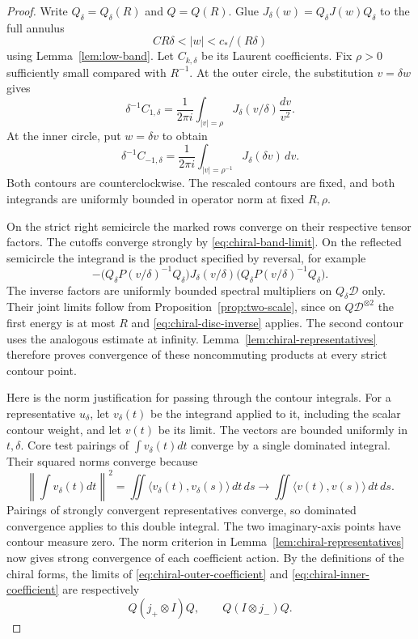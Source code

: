 \begin{proof}
Write $Q_\delta=Q_\delta(R)$ and $Q=Q(R)$. Glue
$J_\delta(w)=Q_\delta J(w)Q_\delta$ to the full annulus
\[
                  CR\delta<|w|<c_* /(R\delta)
\]
using Lemma~\ref{lem:low-band}. Let $C_{k,\delta}$ be its Laurent
coefficients. Fix $\rho>0$ sufficiently small compared with $R^{-1}$.
At the outer circle, the substitution $v=\delta w$ gives
\begin{equation}\label{eq:chiral-outer-coefficient}
 \delta^{-1}C_{1,\delta}
    =\frac1{2\pi i}\int_{|v|=\rho}
                  J_\delta(v/\delta)\frac{dv}{v^2}.
\end{equation}
At the inner circle, put $w=\delta v$ to obtain
\begin{equation}\label{eq:chiral-inner-coefficient}
 \delta^{-1}C_{-1,\delta}
    =\frac1{2\pi i}\int_{|v|=\rho^{-1}}
                              J_\delta(\delta v)\,dv.
\end{equation}
Both contours are counterclockwise. The rescaled contours are fixed, and
both integrands are uniformly bounded in operator norm at fixed $R,\rho$.

On the strict right semicircle the marked rows converge on their respective
tensor factors. The cutoffs converge strongly by
\eqref{eq:chiral-band-limit}. On the reflected semicircle the integrand is
the product specified by reversal, for example
\[
 -\bigl(Q_\delta P(v/\delta)^{-1}Q_\delta\bigr)
     J_\delta(v/\delta)
     \bigl(Q_\delta P(v/\delta)^{-1}Q_\delta\bigr).
\]
The inverse factors are uniformly bounded spectral multipliers on
$Q_\delta\mathcal D$ only. Their joint limits follow from
Proposition~\ref{prop:two-scale}, since on $Q\mathcal D^{\otimes2}$
the first energy is at most $R$ and \eqref{eq:chiral-disc-inverse}
applies. The second contour uses the analogous estimate at infinity.
Lemma~\ref{lem:chiral-representatives} therefore proves convergence of
these noncommuting products at every strict contour point.

Here is the norm justification for passing through the contour integrals.
For a representative $u_\delta$, let $v_\delta(t)$ be the integrand
applied to it, including the scalar contour weight, and let $v(t)$ be
its limit. The vectors are bounded uniformly in $t,\delta$. Core test
pairings of $\int v_\delta(t)dt$ converge by a single dominated integral.
Their squared norms converge because
\begin{equation}\label{eq:chiral-double-contour}
 \left\|\int v_\delta(t)dt\right\|^2
 =\iint\langle v_\delta(t),v_\delta(s)\rangle\,dt\,ds
 \longrightarrow
 \iint\langle v(t),v(s)\rangle\,dt\,ds.
\end{equation}
Pairings of strongly convergent representatives converge, so dominated
convergence applies to this double integral. The two imaginary-axis points
have contour measure zero. The norm criterion in
Lemma~\ref{lem:chiral-representatives} now gives strong convergence of
each coefficient action. By the definitions of the chiral forms, the
limits of \eqref{eq:chiral-outer-coefficient} and
\eqref{eq:chiral-inner-coefficient} are respectively
\[
                 Q(j_+\otimes I)Q,
                   \qquad Q(I\otimes j_-)Q.
\]


\end{proof}
